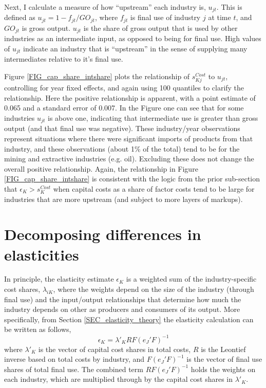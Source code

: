 \documentclass[11pt]{article}
\begin{document}
Next, I calculate a measure of how ``upstream'' each industry is, $u_{jt}$. This is defined as $u_{jt} = 1 - f_{jt}/GO_{jt}$, where $f_{jt}$ is final use of industry $j$ at time $t$, and $GO_{jt}$ is gross output. $u_{jt}$ is the share of gross output that is used by other industries as an intermediate input, as opposed to being for final use. High values of $u_{jt}$ indicate an industry that is ``upstream'' in the sense of supplying many intermediates relative to it's final use.

Figure \ref{FIG_cap_share_intshare} plots the relationship of $s_{Kj}^{Cost}$ to $u_{jt}$, controlling for year fixed effects, and again using 100 quantiles to clarify the relationship. Here the positive relationship is apparent, with a point estimate of 0.065 and a standard error of 0.007. In the Figure one can see that for some industries $u_{jt}$ is above one, indicating that intermediate use is greater than gross output (and that final use was negative). These industry/year observations represent situations where there were significant imports of products from that industry, and these observations (about 1\% of the total) tend to be for the mining and extractive industries (e.g. oil). Excluding these does not change the overall positive relationship. Again, the relationship in Figure \ref{FIG_cap_share_intshare} is consistent with the logic from the prior sub-section that $\epsilon_K > s_K^{Cost}$ when capital costs as a share of factor costs tend to be large for industries that are more upstream (and subject to more layers of markups). 

\section{Decomposing differences in elasticities}\label{SEC_decomp}
In principle, the elasticity estimate $\epsilon_{K}$ is a weighted sum of the industry-specific cost shares, $\lambda_{iK}$, where the weights depend on the size of the industry (through final use) and the input/output relationships that determine how much the industry depends on other as producers and consumers of its output. More specifically, from Section \ref{SEC_elasticity_theory} the elasticity calculation can be written as follows, 
\begin{equation}
	\epsilon_K = \lambda'_K R F \left(e_J'F\right)^{-1} 
\end{equation}
where $\lambda'_K$ is the vector of capital cost shares in total costs, $R$ is the Leontief inverse based on total costs by industry, and $F \left(e_J'F\right)^{-1}$ is the vector of final use shares of total final use. The combined term $R F \left(e_J'F\right)^{-1}$ holds the weights on each industry, which are multiplied through by the capital cost shares in $\lambda'_K$.
\end{document}
